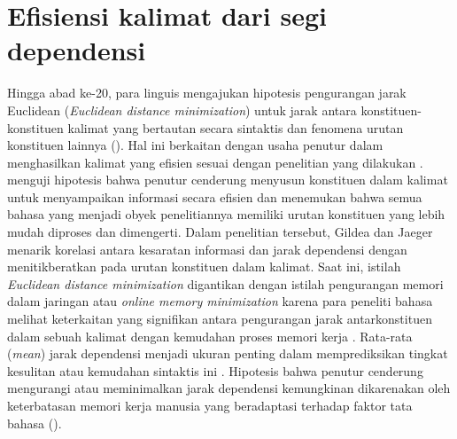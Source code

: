 \section{Efisiensi kalimat dari segi dependensi}
Hingga abad ke-20, para linguis mengajukan hipotesis pengurangan jarak Euclidean (\textit{Euclidean distance minimization}) untuk jarak antara konstituen-konstituen kalimat yang bertautan secara sintaktis dan fenomena urutan konstituen lainnya (\citealp{i2004euclidean, ferrer2008some}). Hal ini berkaitan dengan usaha penutur dalam menghasilkan kalimat yang efisien sesuai dengan penelitian yang dilakukan \cite{gildea2015human}. \cite{gildea2015human} menguji hipotesis bahwa penutur cenderung menyusun konstituen dalam kalimat untuk menyampaikan informasi secara efisien dan menemukan bahwa semua bahasa yang menjadi obyek penelitiannya memiliki urutan konstituen yang lebih mudah diproses dan dimengerti. Dalam penelitian tersebut, Gildea dan Jaeger menarik korelasi antara kesaratan informasi dan jarak dependensi dengan menitikberatkan pada urutan konstituen dalam kalimat. Saat ini, istilah \textit{Euclidean distance minimization} digantikan dengan istilah pengurangan memori dalam jaringan atau \textit{online memory minimization} karena para peneliti bahasa melihat keterkaitan yang signifikan antara pengurangan jarak antarkonstituen dalam sebuah kalimat dengan kemudahan proses memori kerja \citep{ferrer2015placement}. Rata-rata (\textit{mean}) jarak dependensi menjadi ukuran penting dalam memprediksikan tingkat kesulitan atau kemudahan sintaktis ini \citep{hudson1995measuring}. Hipotesis bahwa penutur cenderung mengurangi atau meminimalkan jarak dependensi kemungkinan dikarenakan oleh keterbatasan memori kerja manusia yang beradaptasi terhadap faktor tata bahasa (\citealp{i2004euclidean, ferrer2016non, buch2006discontinuous, liu2008dependency, gildea2010grammars, futrell2015large}).

